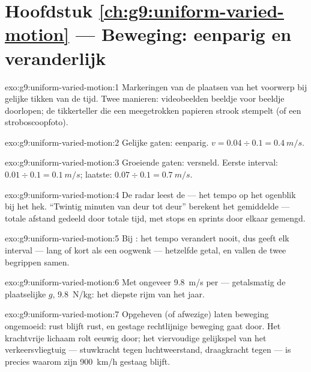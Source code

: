 \section*{Hoofdstuk \ref{ch:g9:uniform-varied-motion} --- Beweging: eenparig en veranderlijk}

\begin{solution}{exo:g9:uniform-varied-motion:1}
Markeringen van de plaatsen van het voorwerp bij gelijke tikken van de
tijd. Twee manieren: videobeelden beeldje voor beeldje doorlopen; de
tikkerteller die een meegetrokken papieren strook stempelt (of een
stroboscoopfoto).
\end{solution}

\begin{solution}{exo:g9:uniform-varied-motion:2}
Gelijke gaten: eenparig. $v = 0.04 \div 0.1 = \qty{0.4}{m/s}$.
\end{solution}

\begin{solution}{exo:g9:uniform-varied-motion:3}
Groeiende gaten: versneld. Eerste interval: $0.01 \div 0.1 =
\qty{0.1}{m/s}$; laatste: $0.07 \div 0.1 = \qty{0.7}{m/s}$.
\end{solution}

\begin{solution}{exo:g9:uniform-varied-motion:4}
De radar leest de  --- het tempo op het
ogenblik bij het hek. ``Twintig minuten van deur tot deur'' berekent het
gemiddelde --- totale afstand gedeeld door totale tijd, met stops en
sprints door elkaar gemengd.
\end{solution}

\begin{solution}{exo:g9:uniform-varied-motion:5}
Bij : het tempo verandert nooit, dus geeft
elk interval --- lang of kort als een oogwenk --- hetzelfde getal, en
vallen de twee begrippen samen.
\end{solution}

\begin{solution}{exo:g9:uniform-varied-motion:6}
Met ongeveer \qty{9.8}{m/s} per  --- getalsmatig de plaatselijke
$g$, \qty{9.8}{N/kg}: het diepste rijm van het jaar.
\end{solution}

\begin{solution}{exo:g9:uniform-varied-motion:7}
Opgeheven (of afwezige)  laten beweging ongemoeid: rust
blijft rust, en gestage rechtlijnige beweging gaat door. Het krachtvrije
lichaam rolt eeuwig door; het viervoudige gelijkspel van het
verkeersvliegtuig --- stuwkracht tegen luchtweerstand, draagkracht tegen
 --- is precies waarom zijn \qty{900}{km/h} gestaag
blijft.
\end{solution}

